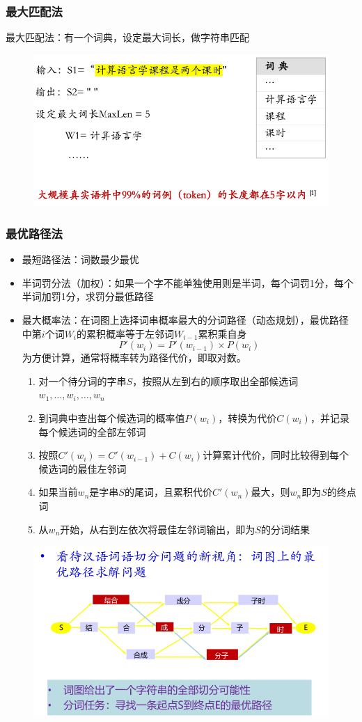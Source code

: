 \subsubsection{最大匹配法}
最大匹配法：有一个词典，设定最大词长，做字符串匹配
\begin{figure}[H]
\centering
\includegraphics[width=0.6\linewidth]{fig/max_matching.png}
\end{figure}

\subsubsection{最优路径法}
\begin{itemize}
\item 最短路径法：词数最少最优
\item 半词罚分法（加权）：如果一个字不能单独使用则是半词，每个词罚1分，每个半词加罚1分，求罚分最低路径
\item 最大概率法：在词图上选择词串概率最大的分词路径（动态规划），最优路径中第$i$个词$W_i$的累积概率等于左邻词$W_{i-1}$累积乘自身
\[P'(w_i)=P'(w_{i-1})\times P(w_i)\]
为方便计算，通常将概率转为路径代价，即取对数。
\begin{enumerate}
	\item 对一个待分词的字串$S$，按照从左到右的顺序取出全部候选词$w_1,\ldots,w_i,\ldots,w_n$
	\item 到词典中查出每个候选词的概率值$P(w_i)$，转换为代价$C(w_i)$，并记录每个候选词的全部左邻词
	\item 按照$C'(w_i)=C'(w_{i-1})+C(w_i)$计算累计代价，同时比较得到每个候选词的最佳左邻词
	\item 如果当前$w_n$是字串$S$的尾词，且累积代价$C'(w_n)$最大，则$w_n$即为$S$的终点词
	\item 从$w_n$开始，从右到左依次将最佳左邻词输出，即为$S$的分词结果
\end{enumerate}
\end{itemize}
\begin{figure}[H]
\centering
\includegraphics[width=0.6\linewidth]{fig/best_path.png}
\end{figure}

